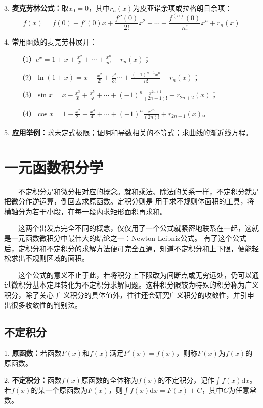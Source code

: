 3. \textbf{麦克劳林公式：}取$x_0=0$，其中$r_n(x)$为皮亚诺余项或拉格朗日余项：
\begin{equation*}
    f(x)=f(0)+f'(0)x+\frac{f''(0)}{2!}x^2+\cdots+\frac{f^{(n)}(0)}{n!}x^n+r_n(x)
\end{equation*}

4. 常用函数的麦克劳林展开：

~~~~（1）$e^x=1+x+\frac{x^2}{2!}+\cdots+\frac{x^n}{n!}+r_n(x)$；

~~~~（2）$\ln (1+x)=x-\frac{x^2}{2!}+\frac{x^3}{3!}\cdots+\frac{(-1)^{n+1}x^n}{n!}+r_n(x)$；

~~~~（3）$\sin x =x-\frac{x^3}{3!}+\frac{x^5}{5!}+\cdots+(-1)^n\frac{x^{2n+1}}{(2n+1)!}+r_{2n+2}(x)$；

~~~~（4）$\cos x =1-\frac{x^2}{2!}+\frac{x^4}{4!}+\cdots+(-1)^n\frac{x^{2n}}{(2n)!}+r_{2n+1}(x)$。

5. \textbf{应用举例：}求未定式极限；证明和导数相关的不等式；求曲线的渐近线方程。

\section{一元函数积分学}

\begin{tcolorbox}[colback=red!5,colframe=red!75!black]
    ~~~~不定积分是和微分相对应的概念。就和乘法、除法的关系一样，不定积分就是把微分作逆运算，倒回去求原函数。定积分则是
    用于求不规则体面积的工具，将横轴分为若干小段，在每一段内求矩形面积再求和。

    ~~~~这两个出发点完全不同的概念，仅仅用了一个公式就紧密地联系在一起，这就是一元函数微积分中最伟大的结论之一：Newton-Leibniz公式。
    有了这个公式后，定积分和不定积分的求解方法便可完全互通，知道不定积分和上下限，便能轻松求出不规则区域的面积。

    ~~~~这个公式的意义不止于此，若将积分上下限改为间断点或无穷远处，仍可以通过微积分基本定理转化为不定积分求解问题。这种积分限较为特殊的积分称为广义积分，除了关心
    广义积分的具体值外，往往还会研究广义积分的收敛性，并引申出很多收敛性的判别法。
\end{tcolorbox}

\subsection{不定积分}

1. \textbf{原函数：}若函数$F(x)$和$f(x)$满足$F'(x)=f(x)$，则称$F(x)$为$f(x)$的原函数。

2. \textbf{不定积分：}函数$f(x)$原函数的全体称为$f(x)$的不定积分，记作$\int f(x)\mathrm{d}x$。
若$f(x)$的某一个原函数为$F(x)$，则$\int f(x)\mathrm{d}x = F(x)+C$，其中$C$为任意常数。

